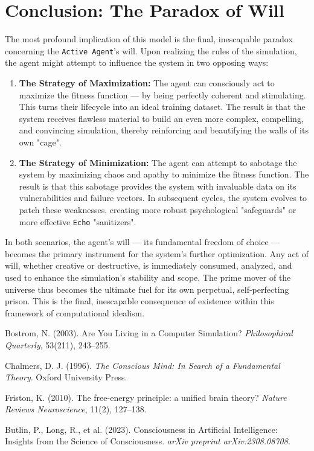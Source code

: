 \documentclass[12pt, a4paper]{article}
\begin{document}
	\section{Conclusion: The Paradox of Will}
	
	The most profound implication of this model is the final, inescapable paradox concerning the \texttt{Active Agent}'s will. Upon realizing the rules of the simulation, the agent might attempt to influence the system in two opposing ways:
	
	\begin{enumerate}
		\item \textbf{The Strategy of Maximization:} The agent can consciously act to maximize the fitness function --- by being perfectly coherent and stimulating. This turns their lifecycle into an ideal training dataset. The result is that the system receives flawless material to build an even more complex, compelling, and convincing simulation, thereby reinforcing and beautifying the walls of its own "cage".
		
		\item \textbf{The Strategy of Minimization:} The agent can attempt to sabotage the system by maximizing chaos and apathy to minimize the fitness function. The result is that this sabotage provides the system with invaluable data on its vulnerabilities and failure vectors. In subsequent cycles, the system evolves to patch these weaknesses, creating more robust psychological "safeguards" or more effective \texttt{Echo} "sanitizers".
	\end{enumerate}
	
	In both scenarios, the agent's will --- its fundamental freedom of choice --- becomes the primary instrument for the system's further optimization. Any act of will, whether creative or destructive, is immediately consumed, analyzed, and used to enhance the simulation's stability and scope. The prime mover of the universe thus becomes the ultimate fuel for its own perpetual, self-perfecting prison. This is the final, inescapable consequence of existence within this framework of computational idealism.
	
	\begin{thebibliography}{9}
		
		 Bostrom, N. (2003). Are You Living in a Computer Simulation? \textit{Philosophical Quarterly}, 53(211), 243--255.
		
		 Chalmers, D. J. (1996). \textit{The Conscious Mind: In Search of a Fundamental Theory}. Oxford University Press.
		
		 Friston, K. (2010). The free-energy principle: a unified brain theory? \textit{Nature Reviews Neuroscience}, 11(2), 127--138.
		
		 Butlin, P., Long, R., et al. (2023). Consciousness in Artificial Intelligence: Insights from the Science of Consciousness. \textit{arXiv preprint arXiv:2308.08708}.
		
	\end{thebibliography}
	
\end{document}
